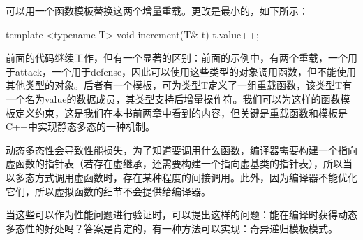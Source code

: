 可以用一个函数模板替换这两个增量重载。更改是最小的，如下所示：

\begin{cpp}
template <typename T>
void increment(T& t) { t.value++; }
\end{cpp}

前面的代码继续工作，但有一个显著的区别：前面的示例中，有两个重载，一个用于attack，一个用于defense，因此可以使用这些类型的对象调用函数，但不能使用其他类型的对象。后者有一个模板，可为类型T定义了一组重载函数，该类型T有一个名为value的数据成员，其类型支持后增量操作符。我们可以为这样的函数模板定义约束，这是我们在本书前两章中看到的内容，但关键是重载函数和模板是C++中实现静态多态的一种机制。

动态多态性会导致性能损失，为了知道要调用什么函数，编译器需要构建一个指向虚函数的指针表（若存在虚继承，还需要构建一个指向虚基类的指针表），所以当以多态方式调用虚函数时，存在某种程度的间接调用。此外，因为编译器不能优化它们，所以虚拟函数的细节不会提供给编译器。

当这些可以作为性能问题进行验证时，可以提出这样的问题：能在编译时获得动态多态性的好处吗？答案是肯定的，有一种方法可以实现：奇异递归模板模式。










































